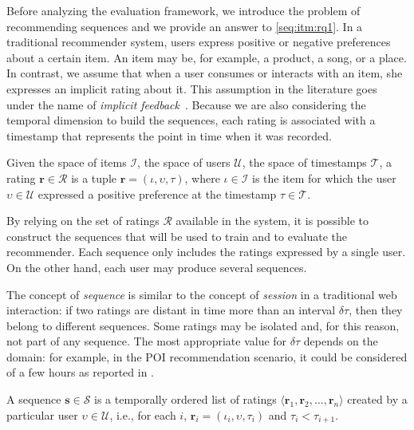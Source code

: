 Before analyzing the evaluation framework, we introduce the problem of recommending sequences and we provide an answer to \ref{seq:itm:rq1}. In a traditional recommender system, users express positive or negative preferences about a certain item. An item may be, for example, a product, a song, or a place. In contrast, we assume that when a user consumes or interacts with an item, she expresses an implicit rating about it. This assumption in the literature goes under the name of \emph{implicit feedback}~\cite{Herlocker2004}. Because we are also considering the temporal dimension to build the sequences, each rating is associated with a timestamp that represents the point in time when it was recorded.

\begin{definition}
Given the space of items $\mathcal{I}$, the space of users $\mathcal{U}$, the space of timestamps $\mathcal{T}$, a rating $\mathbf{r} \in \mathcal{R}$ is a tuple $\mathbf{r} = (\iota, \upsilon, \tau)$, where $\iota \in \mathcal{I}$ is the item for which the user $\upsilon \in \mathcal{U}$ expressed a positive preference at the timestamp $\tau \in \mathcal{T}$.
\end{definition}

By relying on the set of ratings $\mathcal{R}$ available in the system, it is possible to construct the sequences that will be used to train and to evaluate the recommender. Each sequence only includes the ratings expressed by a single user. On the other hand, each user may produce several sequences.

The concept of \emph{sequence} is similar to the concept of \emph{session} in a traditional web interaction: if two ratings are distant in time more than an interval $\delta \tau$, then they belong to different sequences. Some ratings may be isolated and, for this reason, not part of any sequence. The most appropriate value for $\delta \tau$ depends on the domain: for example, in the POI recommendation scenario, it could be considered of a few hours as reported in \cite{Feng2015}.

\begin{definition}
A sequence $\mathbf{s} \in \mathcal{S}$ is a temporally ordered list of ratings $\langle \mathbf{r}_1,\allowbreak \mathbf{r}_2,\allowbreak \dotsc,\allowbreak \mathbf{r}_n \rangle$ created by a particular user $\upsilon \in \mathcal{U}$, i.e., for each $i$, $\mathbf{r}_i = (\iota_i, \upsilon, \tau_i)$ and $\tau_i < \tau_{i + 1}$.
\end{definition}

